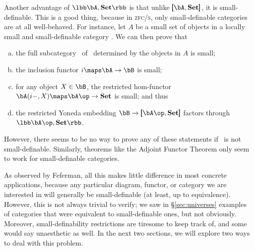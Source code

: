 \documentclass{amsart}
\newcommand{\Set}{\ensuremath{\mathbf{Set}}}
\def\zfcs{\textsc{zfc/s}}
\begin{document}
Another advantage of $\lbb\bA,\Set\rbb$ is that unlike
$\pmb[\bA,\Set\pmb]$, it is small-definable.  This is a good thing,
because in \zfcs, only small-definable categories are at all
well-behaved.  For instance, let $A$ be a small set of objects in a
locally small and small-definable category \bB.  We can then prove
that
\begin{enumerate}[(a)]
\item the full subcategory \bA\ of \bB\ determined by the objects in
  $A$ is small;
\item the inclusion functor $i\maps \bA\to\bB$ is small;
\item for any object $X\in \bB$, the restricted hom-functor
  $\bA(i-,X)\maps \bA\op\to\Set$ is small; and thus
\item the restricted Yoneda embedding $\bB\to \pmb[\bA\op,\Set\pmb]$
  factors through $\lbb\bA\op,\Set\rbb$.
\end{enumerate}
However, there seems to be no way to prove any of these statements if
\bB\ is not small-definable.  Similarly, theorems like the Adjoint
Functor Theorem only seem to work for small-definable categories.

As observed by Feferman, all this makes little difference in most
concrete applications, because any particular diagram, functor, or
category we are interested in will generally be small-definable (at
least, up to equivalence).  However, this is not always trivial to
verify; we saw in \S\ref{sec:universes} examples of categories that
were equivalent to small-definable ones, but not obviously.  Moreover,
small-definability restrictions are tiresome to keep track of, and
some would say unaesthetic as well.  In the next two sections, we will
explore two ways to deal with this problem.




\end{document}
